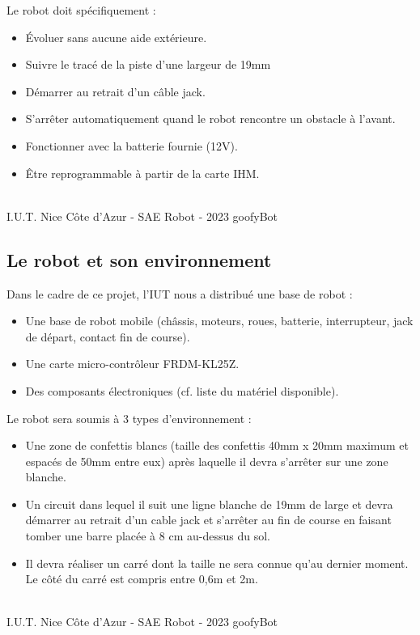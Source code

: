 \noindent Le robot doit spécifiquement :
\begin{itemize}
    \item Évoluer sans aucune aide extérieure.
    \item Suivre le tracé de la piste d’une largeur de 19mm
    \item Démarrer au retrait d’un câble jack.
    \item S'arrêter automatiquement quand le robot rencontre un obstacle à l'avant.
    \item Fonctionner avec la batterie fournie (12V).
    \item Être reprogrammable à partir de la carte IHM.
\end{itemize}

\vfill
\noindent\makebox[\linewidth]{\rule{.8\paperwidth}{.6pt}}\\[0.2cm]
I.U.T. Nice Côte d'Azur - SAE Robot - 2023 \hfill goofyBot
\noindent\makebox[\linewidth]{\rule{.8\paperwidth}{.6pt}}
\newpage

\subsection{Le robot et son environnement}

\noindent Dans le cadre de ce projet, l'IUT nous a distribué une base de robot :

\begin{itemize}
    \item Une base de robot mobile (châssis, moteurs, roues, batterie, interrupteur, jack de départ, contact fin de course).
    \item Une carte micro-contrôleur FRDM-KL25Z.
    \item Des composants électroniques (cf. liste du matériel disponible).
\end{itemize}

\noindent Le robot sera soumis à 3 types d'environnement :

\begin{itemize}
    \item Une zone de confettis blancs (taille des confettis 40mm x 20mm maximum et espacés de 50mm entre eux) après laquelle il devra s'arrêter sur une zone blanche.
    \item Un circuit dans lequel il suit une ligne blanche de 19mm de large et devra démarrer au retrait d'un cable jack et s'arrêter au fin de course en faisant tomber une barre placée à 8 cm au-dessus du sol.
    \item Il devra réaliser un carré dont la taille ne sera connue qu'au dernier moment. Le côté du carré est compris entre 0,6m et 2m.
\end{itemize}

\vfill
\noindent\makebox[\linewidth]{\rule{.8\paperwidth}{.6pt}}\\[0.2cm]
I.U.T. Nice Côte d'Azur - SAE Robot - 2023 \hfill goofyBot
\noindent\makebox[\linewidth]{\rule{.8\paperwidth}{.6pt}}
\newpage